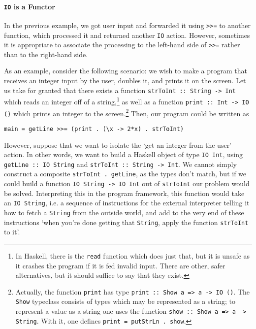 \documentclass[11pt]{article}
\theoremstyle{nonumberplain}
\newcommand*\lsin{\lstinline}
\begin{document}
\paragraph{\texttt{IO} is a Functor}

In the previous example, we got user input and forwarded it using \lsin|>>=| to another function, which processed it and returned another \lsin|IO| action. However, sometimes it is appropriate to associate the processing to the left-hand side of \lsin|>>=| rather than to the right-hand side.

As an example, consider the following scenario: we wish to make a program that receives an integer input by the user, doubles it, and prints it on the screen. Let us take for granted that there exists a function \lsin|strToInt :: String -> Int| which reads an integer off of a string,\footnote{In Haskell, there is the \lsin|read| function which does just that, but it is unsafe as it crashes the program if it is fed invalid input. There are other, safer alternatives, but it should suffice to say that they exist.} as well as a function \lsin|print :: Int -> IO ()| which prints an integer to the screen.\footnote{Actually, the function \lsin|print| has type \lsin|print :: Show a => a -> IO ()|. The \lsin|Show| typeclass consists of types which may be represented as a string; to represent a value as a string one uses the function \lsin|show :: Show a => a -> String|. With it, one defines \lsin|print = putStrLn . show|.} Then, our program could be written as
\begin{lstlisting}
main = getLine >>= (print . (\x -> 2*x) . strToInt)
\end{lstlisting}


However, suppose that we want to isolate the `get an integer from the user' action. In other words, we want to build a Haskell object of type \lsin|IO Int|, using \lsin|getLine :: IO String| and \lsin|strToInt :: String -> Int|. We cannot simply construct a composite \lsin|strToInt . getLine|, as the types don't match, but if we could build a function \lsin|IO String -> IO Int| out of \lsin|strToInt| our problem would be solved. Interpreting this in the program framework, this function would take an \lsin|IO String|, i.e. a sequence of instructions for the external interpreter telling it how to fetch a \lsin|String| from the outside world, and add to the very end of these instructions `when you're done getting that \lsin|String|, apply the function \lsin|strToInt| to it'. 
\end{document}
